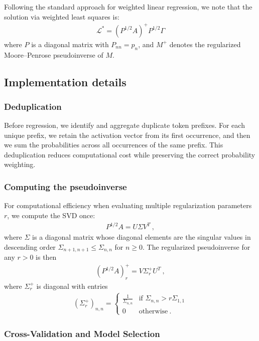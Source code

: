 \documentclass[prx,nofootinbib,onecolumn,showkeys,groupaddress,preprintnumbers,floatfix,
superscriptaddress]{revtex4-1}
\begin{document}
Following the standard approach for weighted linear regression, we note that the solution via weighted least squares is:
%
\begin{align}
\mathcal{L}^* = (P^{1/2}A)^+ P^{1/2} \Gamma
\end{align}
%
where $P$ is a diagonal matrix with  $P_{nn} = p_n$, %
and $M^+$ denotes the regularized Moore--Penrose pseudoinverse of $M$.

\subsection{Implementation details}

\subsubsection{Deduplication}
Before regression, we identify and aggregate duplicate token prefixes. For each unique prefix, we retain the activation vector from its first occurrence, and then we sum the probabilities across all occurrences of the same prefix. This deduplication reduces computational cost while preserving the correct probability weighting.

\subsubsection{Computing the pseudoinverse}
For computational efficiency when evaluating multiple regularization parameters $r$, we compute the SVD once:
\begin{align}
P^{1/2}A = U \Sigma V^T ~,
\end{align}
where $\Sigma$ is a diagonal matrix whose diagonal elements are the singular values in descending order
$\Sigma_{n+1,n+1} \leq \Sigma_{n,n}$ for $n \geq 0$.
%
The regularized pseudoinverse for any $r>0$ is then
\begin{align}
(P^{1/2}A)^+_r = V\Sigma^+_r U^T ~,
\end{align}
where $\Sigma^+_r$ 
is diagonal with entries
\begin{align}
(\Sigma^+_r)_{n,n} = \begin{cases}
\frac{1}{\Sigma_{n,n}} & \text{if } \Sigma_{n,n} > r  \Sigma_{1,1} \\
0 & \text{otherwise} ~.
\end{cases} 
\end{align}



\subsubsection{Cross-Validation and Model Selection}
\end{document}
